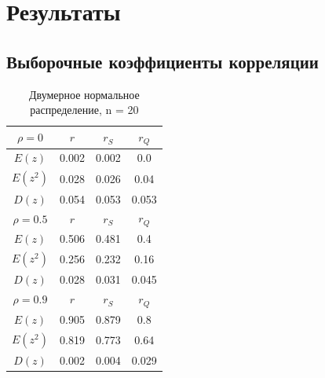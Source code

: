 \section{Результаты}
\subsection{Выборочные коэффициенты корреляции}
\begin{table}[H]
	\centering
	\begin{tabular}{| c | c | c | c |}
		
		\hline
		$\rho = 0$ & $r$      & $r_S$  & $r_Q$ \\
		\hline
		$E(z)$    & 0.002 & 0.002 & 0.0   \\
		$E(z^2)$  & 0.028 & 0.026 & 0.04  \\
		$D(z)$    & 0.054 & 0.053 & 0.053 \\
		\hline
		$\rho = 0.5$ & $r$      & $r_S$  & $r_Q$ \\
		\hline
		$E(z)$       & 0.506 & 0.481 & 0.4   \\
		$E(z^2)$    & 0.256 & 0.232 & 0.16  \\
		$D(z)$      & 0.028 & 0.031 & 0.045 \\
		\hline
		$\rho = 0.9$ & $r$      & $r_S$  & $r_Q$ \\
		\hline
		$E(z)$       & 0.905 & 0.879 & 0.8   \\
		$E(z^2)$    & 0.819 & 0.773 & 0.64  \\
		$D(z)$      & 0.002 & 0.004 & 0.029 \\
		\hline
		
	\end{tabular}{}
	\caption{Двумерное нормальное распределение, n = 20}
	\label{tab:n20}
\end{table}


